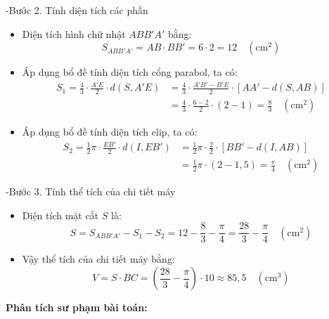 \documentclass[12pt,a4paper,oneside]{book}
\theoremstyle{theorem}
\theoremstyle{definition}
\begin{document}
-Bước 2. Tính diện tích các phần
\begin{itemize}
    \item Diện tích hình chữ nhật $ABB'A'$ bằng:
    \[
    S_{ABB'A'} = AB \cdot BB' = 6 \cdot 2 = 12 \quad (\text{cm}^2)
    \]
    
    \item Áp dụng bổ đề tính diện tích cổng parabol, ta có:
  \begin{align*}  
    S_1 = \frac{4}{3} \cdot \frac{A'E}{2} \cdot d(S, A'E) 
    &= \frac{4}{3} \cdot \frac{A'B' - B'E}{2} \cdot \left[AA' - d(S, AB)\right]\\[0.8em]
    &= \frac{4}{3} \cdot \frac{6 - 2}{2} \cdot (2 - 1) = \frac{8}{3} \quad (\text{cm}^2)
    \end{align*}

    \item Áp dụng bổ đề tính diện tích elip, ta có:
   \begin{align*}
    S_2 = \frac{1}{2}\pi \cdot \frac{EB'}{2} \cdot d(I, EB') 
    &= \frac{1}{2}\pi \cdot \frac{2}{2} \cdot \left[BB' - d(I, AB)\right]\\[0.8em]
    &= \frac{1}{2}\pi \cdot (2 - 1{,}5) = \frac{\pi}{4} \quad (\text{cm}^2)
    \end{align*}
\end{itemize}

-Bước 3. Tính thể tích của chi tiết máy
\begin{itemize}
    \item Diện tích mặt cắt $S$ là:
    \[
    S = S_{ABB'A'} - S_1 - S_2 = 12 - \frac{8}{3} - \frac{\pi}{4} = \frac{28}{3} - \frac{\pi}{4} \quad (\text{cm}^2)
    \]

    \item Vậy thể tích của chi tiết máy bằng:
    \[
    V = S \cdot BC = \left(\frac{28}{3} - \frac{\pi}{4}\right) \cdot 10 \approx 85{,}5 \quad (\text{cm}^3)
    \]
\end{itemize}
\begin{center}
    \textbf{Phân tích sư phạm bài toán:}
\end{center} 
\end{document}
